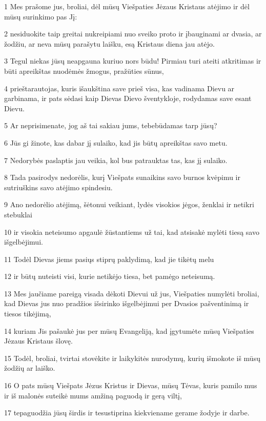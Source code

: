 \par 1 Mes prašome jus, broliai, dėl mūsų Viešpaties Jėzaus Kristaus atėjimo ir dėl mūsų surinkimo pas Jį: 
\par 2 nesiduokite taip greitai nukreipiami nuo sveiko proto ir įbauginami ar dvasia, ar žodžiu, ar neva mūsų parašytu laišku, esą Kristaus diena jau atėjo. 
\par 3 Tegul niekas jūsų neapgauna kuriuo nors būdu! Pirmiau turi ateiti atkritimas ir būti apreikštas nuodėmės žmogus, pražūties sūnus, 
\par 4 prieštarautojas, kuris išaukština save prieš visa, kas vadinama Dievu ar garbinama, ir pats sėdasi kaip Dievas Dievo šventykloje, rodydamas save esant Dievu. 
\par 5 Ar neprisimenate, jog aš tai sakiau jums, tebebūdamas tarp jūsų? 
\par 6 Jūs gi žinote, kas dabar jį sulaiko, kad jis būtų apreikštas savo metu. 
\par 7 Nedorybės paslaptis jau veikia, kol bus patrauktas tas, kas jį sulaiko. 
\par 8 Tada pasirodys nedorėlis, kurį Viešpats sunaikins savo burnos kvėpimu ir sutriuškins savo atėjimo spindesiu. 
\par 9 Ano nedorėlio atėjimą, šėtonui veikiant, lydės visokios jėgos, ženklai ir netikri stebuklai 
\par 10 ir visokia neteisumo apgaulė žūstantiems už tai, kad atsisakė mylėti tiesą savo išgelbėjimui. 
\par 11 Todėl Dievas jiems pasiųs stiprų paklydimą, kad jie tikėtų melu 
\par 12 ir būtų nuteisti visi, kurie netikėjo tiesa, bet pamėgo neteisumą. 
\par 13 Mes jaučiame pareigą visada dėkoti Dievui už jus, Viešpaties numylėti broliai, kad Dievas jus nuo pradžios išsirinko išgelbėjimui per Dvasios pašventinimą ir tiesos tikėjimą, 
\par 14 kuriam Jis pašaukė jus per mūsų Evangeliją, kad įgytumėte mūsų Viešpaties Jėzaus Kristaus šlovę. 
\par 15 Todėl, broliai, tvirtai stovėkite ir laikykitės nurodymų, kurių išmokote iš mūsų žodžių ar laiško. 
\par 16 O pats mūsų Viešpats Jėzus Kristus ir Dievas, mūsų Tėvas, kuris pamilo mus ir iš malonės suteikė mums amžiną paguodą ir gerą viltį, 
\par 17 tepaguodžia jūsų širdis ir tesustiprina kiekviename gerame žodyje ir darbe.


